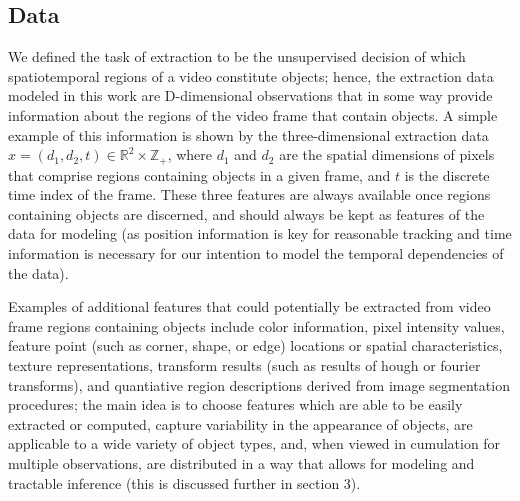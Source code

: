 \documentclass{article}
\begin{document}
\subsection{Data}
%
We defined the task of extraction to be the unsupervised decision of which spatiotemporal regions of a video constitute objects; hence, the extraction data modeled in this work are D-dimensional observations that in some way provide information about the regions of the video frame that contain objects. A simple example of this information is shown by the three-dimensional extraction data $x = ( d_{1}, d_{2}, t ) \in \mathbb{R}^{2} \times \mathbb{Z}_{+}$, where $d_{1}$ and $d_{2}$ are the spatial dimensions of pixels that comprise regions containing objects in a given frame, and $t$ is the discrete time index of the frame. These three features are always available once regions containing objects are discerned, and should always be kept as features of the data for modeling (as position information is key for reasonable tracking and time information is necessary for our intention to model the temporal dependencies of the data).

Examples of additional features that could potentially be extracted from video frame regions containing objects include color information, pixel intensity values, feature point (such as corner, shape, or edge) locations or spatial characteristics, texture representations, transform results (such as results of hough or fourier transforms), and quantiative region descriptions derived from image segmentation procedures; the main idea is to choose features which are able to be easily extracted or computed, capture variability in the appearance of objects, are applicable to a wide variety of object types, and, when viewed in cumulation for multiple observations, are distributed in a way that allows for modeling and tractable inference (this is discussed further in section 3).
\end{document}
